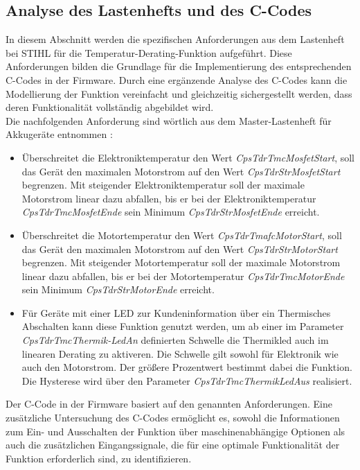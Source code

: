 \subsection{Analyse des Lastenhefts und des C-Codes}
\label{subsec_tdr_analyse}
In diesem Abschnitt werden die spezifischen Anforderungen aus dem Lastenheft bei STIHL für die Temperatur-Derating-Funktion aufgeführt. Diese Anforderungen bilden die Grundlage für die Implementierung des entsprechenden C-Codes in der Firmware. Durch eine ergänzende Analyse des C-Codes kann die Modellierung der Funktion vereinfacht und gleichzeitig sichergestellt werden, dass deren Funktionalität vollständig abgebildet wird. \\
Die nachfolgenden Anforderung sind wörtlich aus dem Master-Lastenheft für Akkugeräte entnommen \cite{Lastenheft}:
\begin{itemize}
\item Überschreitet die Elektroniktemperatur den Wert \textit{CpsTdrTmcMosfetStart}, soll das Gerät den maximalen Motorstrom auf den Wert \textit{CpsTdrStrMosfetStart} begrenzen. Mit steigender Elektroniktemperatur soll der maximale Motorstrom linear dazu abfallen, bis er bei der Elektroniktemperatur \textit{CpsTdrTmcMosfetEnde} sein Minimum \textit{CpsTdrStrMosfetEnde} erreicht.
\item Überschreitet die Motortemperatur den Wert \textit{CpsTdrTmafcMotorStart}, soll das Gerät den maximalen Motorstrom auf den Wert \textit{CpsTdrStrMotorStart} begrenzen. Mit steigender Motortemperatur soll der maximale Motorstrom linear dazu abfallen, bis er bei der Motortemperatur \textit{CpsTdrTmcMotorEnde} sein Minimum \textit{CpsTdrStrMotorEnde} erreicht.
\item Für Geräte mit einer LED zur Kundeninformation über ein Thermisches Abschalten kann diese Funktion genutzt werden, um ab einer im Parameter \textit{CpsTdrTmcThermik-LedAn} definierten Schwelle die Thermikled auch im linearen Derating zu aktiveren. Die Schwelle gilt sowohl für Elektronik wie auch den Motorstrom. Der größere Prozentwert bestimmt dabei die Funktion. Die Hysterese wird über den Parameter \textit{CpsTdrTmcThermikLedAus} realisiert.
\end{itemize}
Der C-Code in der Firmware basiert auf den genannten Anforderungen. Eine zusätzliche Untersuchung des C-Codes ermöglicht es, sowohl die Informationen zum Ein- und Ausschalten der Funktion über maschinenabhängige Optionen als auch die zusätzlichen Eingangssignale, die für eine optimale Funktionalität der Funktion erforderlich sind, zu identifizieren. \\

